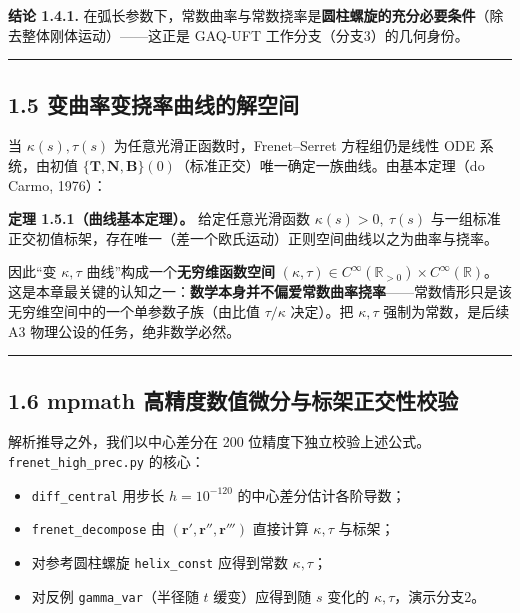 \textbf{结论 1.4.1.}
在弧长参数下，常数曲率与常数挠率是\textbf{圆柱螺旋的充分必要条件}（除去整体刚体运动）------这正是
GAQ‑UFT 工作分支（分支3）的几何身份。

\begin{center}\rule{0.5\linewidth}{0.5pt}\end{center}

\subsection{1.5
变曲率变挠率曲线的解空间}\label{ux53d8ux66f2ux7387ux53d8ux6320ux7387ux66f2ux7ebfux7684ux89e3ux7a7aux95f4}

当 \(\kappa(s),\tau(s)\) 为任意光滑正函数时，Frenet--Serret
方程组仍是线性 ODE 系统，由初值
\(\{\mathbf{T},\mathbf{N},\mathbf{B}\}(0)\)（标准正交）唯一确定一族曲线。由基本定理（do
Carmo, 1976）：

\textbf{定理 1.5.1（曲线基本定理）。} 给定任意光滑函数
\(\kappa(s)>0,\ \tau(s)\)
与一组标准正交初值标架，存在唯一（差一个欧氏运动）正则空间曲线以之为曲率与挠率。

因此``变 \(\kappa,\tau\) 曲线''构成一个\textbf{无穷维函数空间}
\((\kappa,\tau)\in C^\infty(\mathbb{R}_{>0})\times C^\infty(\mathbb{R})\)。这是本章最关键的认知之一：\textbf{数学本身并不偏爱常数曲率挠率}------常数情形只是该无穷维空间中的一个单参数子族（由比值
\(\tau/\kappa\) 决定）。把 \(\kappa,\tau\) 强制为常数，是后续 A3
物理公设的任务，绝非数学必然。

\begin{center}\rule{0.5\linewidth}{0.5pt}\end{center}

\subsection{1.6 mpmath
高精度数值微分与标架正交性校验}\label{mpmath-ux9ad8ux7cbeux5ea6ux6570ux503cux5faeux5206ux4e0eux6807ux67b6ux6b63ux4ea4ux6027ux6821ux9a8c}

解析推导之外，我们以中心差分在 200
位精度下独立校验上述公式。\texttt{frenet\_high\_prec.py} 的核心：

\begin{itemize}
\tightlist
\item
  \texttt{diff\_central} 用步长 \(h=10^{-120}\) 的中心差分估计各阶导数；
\item
  \texttt{frenet\_decompose} 由
  \((\mathbf{r}',\mathbf{r}'',\mathbf{r}''')\) 直接计算 \(\kappa,\tau\)
  与标架；
\item
  对参考圆柱螺旋 \texttt{helix\_const} 应得到常数 \(\kappa,\tau\)；
\item
  对反例 \texttt{gamma\_var}（半径随 \(t\) 缓变）应得到随 \(s\) 变化的
  \(\kappa,\tau\)，演示分支2。
\end{itemize}

